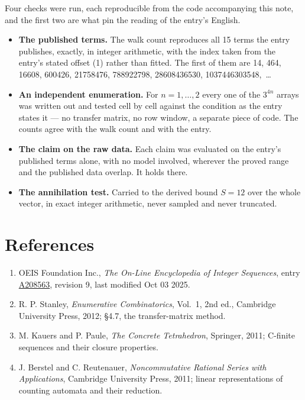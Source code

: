 \documentclass[11pt]{article}
\theoremstyle{definition}
\begin{document}
Four checks were run, each reproducible from the code accompanying this note, and the first two are what pin the reading of the entry's English.

\begin{itemize}

\item {\bfseries The published terms.} The walk count reproduces all 15 terms the entry publishes, exactly, in integer arithmetic, with the index taken from the entry's stated offset (1) rather than fitted. The first of them are 14, 464, 16608, 600426, 21758476, 788922798, 28608436530, 1037446303548,~\dots

\item {\bfseries An independent enumeration.} For $n = 1,\dots,2$ every one of the $3^{4n}$ arrays was written out and tested cell by cell against the condition as the entry states it --- no transfer matrix, no row window, a separate piece of code. The counts agree with the walk count and with the entry.

\item {\bfseries The claim on the raw data.} Each claim was evaluated on the entry's published terms alone, with no model involved, wherever the proved range and the published data overlap. It holds there.

\item {\bfseries The annihilation test.} Carried to the derived bound $S = 12$ over the whole vector, in exact integer arithmetic, never sampled and never truncated.

\end{itemize}

\section{References}

\begin{enumerate}

\item OEIS Foundation Inc., \emph{The On-Line Encyclopedia of Integer Sequences}, entry \href{https://oeis.org/A208563}{A208563}, revision 9, last modified Oct 03 2025.

\item R. P. Stanley, \emph{Enumerative Combinatorics}, Vol.~1, 2nd ed., Cambridge University Press, 2012; \S4.7, the transfer-matrix method.

\item M. Kauers and P. Paule, \emph{The Concrete Tetrahedron}, Springer, 2011; C-finite sequences and their closure properties.

\item J. Berstel and C. Reutenauer, \emph{Noncommutative Rational Series with Applications}, Cambridge University Press, 2011; linear representations of counting automata and their reduction.

\end{enumerate}
\end{document}
